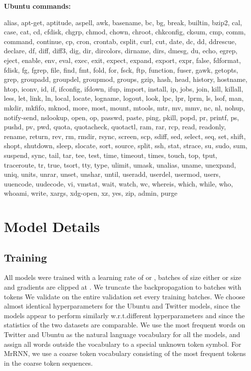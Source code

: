 \documentclass{article}
\begin{document}
\textbf{Ubuntu commands:}
\begin{framed}
\scriptsize
alias, apt-get, aptitude, aspell, awk, basename, bc, bg, break, builtin, bzip2, cal, case, cat, cd, cfdisk, chgrp, chmod, chown, chroot, chkconfig, cksum, cmp, comm, command, continue, cp, cron, crontab, csplit, curl, cut, date, dc, dd, ddrescue, declare, df, diff, diff3, dig, dir, dircolors, dirname, dirs, dmesg, du, echo, egrep, eject, enable, env, eval, exec, exit, expect, expand, export, expr, false, fdformat, fdisk, fg, fgrep, file, find, fmt, fold, for, fsck, ftp, function, fuser, gawk, getopts, grep, groupadd, groupdel, groupmod, groups, gzip, hash, head, history, hostname, htop, iconv, id, if, ifconfig, ifdown, ifup, import, install, ip, jobs, join, kill, killall, less, let, link, ln, local, locate, logname, logout, look, lpc, lpr, lprm, ls, lsof, man, mkdir, mkfifo, mknod, more, most, mount, mtools, mtr, mv, mmv, nc, nl, nohup, notify-send, nslookup, open, op, passwd, paste, ping, pkill, popd, pr, printf, ps, pushd, pv, pwd, quota, quotacheck, quotactl, ram, rar, rcp, read, readonly, rename, return, rev, rm, rmdir, rsync, screen, scp, sdiff, sed, select, seq, set, shift, shopt, shutdown, sleep, slocate, sort, source, split, ssh, stat, strace, su, sudo, sum, suspend, sync, tail, tar, tee, test, time, timeout, times, touch, top, tput, traceroute, tr, true, tsort, tty, type, ulimit, umask, unalias, uname, unexpand, uniq, units, unrar, unset, unshar, until, useradd, userdel, usermod, users, uuencode, uudecode, vi, vmstat, wait, watch, wc, whereis, which, while, who, whoami, write, xargs, xdg-open, xz, yes, zip, admin, purge
\end{framed}

\newpage

\section{Model Details} \label{app:model_details}

\subsection*{Training}

All models were trained with a learning rate of  or , batches of size either  or size  and gradients are clipped at .
We truncate the backpropagation to batches with  tokens
We validate on the entire validation set every  training batches.
We choose almost identical hyperparameters for the Ubuntu and Twitter models, since the models appear to perform similarly w.r.t.\@ different hyperparameters and since the statistics of the two datasets are comparable.
We use the  most frequent words on Twitter and Ubuntu as the natural language vocabulary for all the models, and assign all words outside the vocabulary to a special unknown token symbol.
For MrRNN, we use a coarse token vocabulary consisting of the  most frequent tokens in the coarse token sequences.
\end{document}
